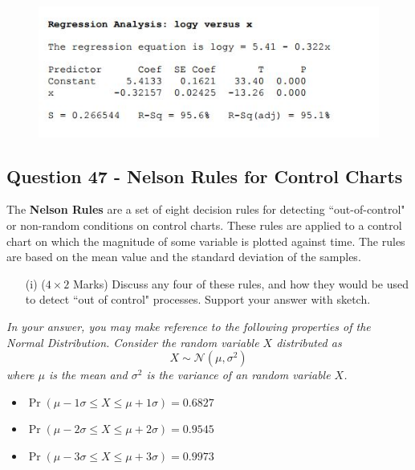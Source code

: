 \documentclass[a4paper,12pt]{article}
\begin{document}
\begin{figure}[h!]
	\centering
	\includegraphics[width=0.8\linewidth]{images/ReviewQ18-d}
\end{figure}

\newpage

\subsection*{Question 47 - Nelson Rules for Control Charts}
The \textbf{Nelson Rules} are a set of eight decision rules for detecting ``out-of-control" or non-random conditions on control charts. These rules are applied to a control chart on which the magnitude of some variable is plotted against time. The rules are based on the mean value and the standard deviation of the samples.\\

\begin{itemize}
\item[(i)] ($4 \times 2$ Marks) Discuss any four of these rules, and how they would be used to detect ``out of control" processes. Support your answer with sketch.
\end{itemize}

\bigskip 
\begin{framed}
\noindent \textit{In your answer, you may make reference to the following properties of the Normal Distribution. Consider the random variable $X$ distributed as
\[X \sim \mathcal{N}(\mu,\sigma^2)\]
where $\mu$ is the mean and $\sigma^2$ is the variance of an random variable $X$.}
\begin{itemize}
	\item $\Pr( \mu - 1\sigma \leq X \leq \mu + 1\sigma ) = 0.6827$
	\item $\Pr( \mu - 2\sigma \leq X \leq \mu + 2\sigma ) = 0.9545$
	\item $\Pr( \mu - 3\sigma \leq X \leq \mu + 3\sigma )= 0.9973$
	
\end{itemize}
\end{framed}
\end{document}

